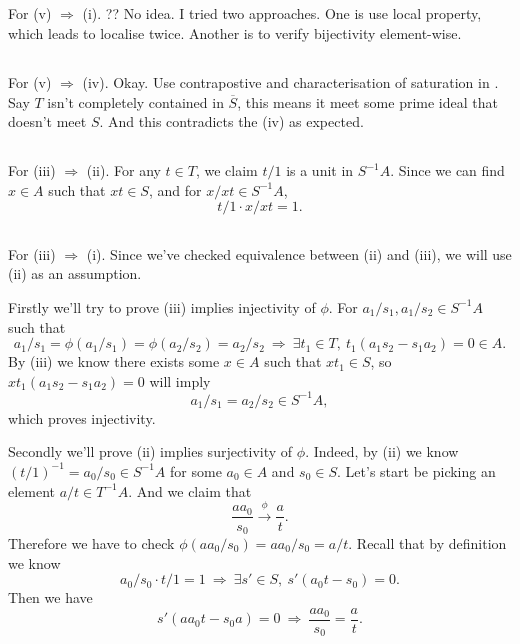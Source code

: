 \subsection{}

For (v) $\Rightarrow$ (i). 
?? No idea. I tried two approaches. One is use local property, which leads to localise twice. Another is to verify bijectivity element-wise.

\subsection{}

For (v) $\Rightarrow$ (iv). Okay. Use contrapostive and characterisation of saturation in . Say $T$ isn't completely contained in $\overline{S}$, this means it meet some prime ideal that doesn't meet $S$. And this contradicts the (iv) as expected.

\subsection{}

For (iii) $\Rightarrow$ (ii). For any $t\in T$, we claim $t/1$ is a unit in $S^{-1}A$. Since we can find $x\in A$ such that $xt\in S$, and for $x/xt\in S^{-1}A$,
\[t/1\cdot x/xt = 1.\]

\subsection{}

For (iii) $\Rightarrow$ (i). Since we've checked equivalence between (ii) and (iii), we will use (ii) as an assumption.

Firstly we'll try to prove (iii) implies injectivity of $\phi$. For $a_1/s_1,a_1/s_2\in S^{-1}A$ such that \[a_1/s_1=\phi(a_1/s_1)=\phi(a_2/s_2)=a_2/s_2 ~\Rightarrow~ \exists t_1\in T,~ t_1(a_1s_2-s_1a_2)=0\in A.\]
By (iii) we know there exists some $x\in A$ such that $xt_1\in S$, so $xt_1(a_1s_2-s_1a_2)=0$ will imply \[a_1/s_1=a_2/s_2\in S^{-1}A,\] which proves injectivity.

Secondly we'll prove (ii) implies surjectivity of $\phi$.
Indeed, by (ii) we know $(t/1)^{-1}=a_0/s_0\in S^{-1}A$ for some $a_0\in A$ and $s_0\in S$. Let's start be picking an element $a/t\in T^{-1}A$. And we claim that \[\frac{aa_0}{s_0}\overset{\phi}{\rightarrow}\frac{a}{t}.\] Therefore we have to check $\phi(aa_0/s_0)=aa_0/s_0=a/t$. Recall that by definition we know \[a_0/s_0\cdot t/1=1 ~\Rightarrow~ \exists s'\in S,~ s'(a_0t-s_0)=0.\] Then we have \[s'(aa_0t-s_0a)=0 ~\Rightarrow~ \frac{aa_0}{s_0}=\frac{a}{t}.\]

